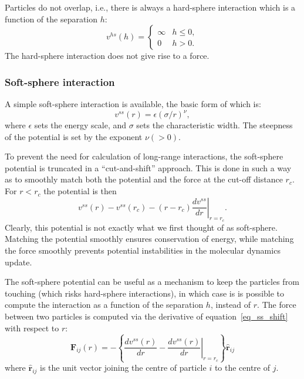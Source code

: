 Particles do not overlap, i.e., there is always
a hard-sphere interaction which is a function of the separation $h$:
\begin{equation}
v^{hs}(h) = \left\{
\begin{array}{ll}
\infty & h \leq 0,\\
0   & h > 0.
\end{array} \right.
\end{equation}
The hard-sphere interaction does not give rise to a force.


\subsubsection{Soft-sphere interaction}

A simple soft-sphere interaction is available, the basic form
of which is:
\begin{equation}
v^{ss}(r) = \epsilon (\sigma / r)^{\nu},
\end{equation}
where $\epsilon$ sets the energy scale, and $\sigma$ sets the
characteristic width. The steepness of the potential is set by
the exponent $\nu (> 0)$.

To prevent the need for calculation of long-range interactions,
the soft-sphere potential is truncated in a ``cut-and-shift''
approach. This is done in such a way as to smoothly match
both the potential and the force at the cut-off distance
$r_c$. For $r < r_c$ the potential is then
\begin{equation}
v^{ss}(r) - v^{ss}(r_c) - (r - r_c) \left.\frac{d v^{ss}}{dr}\right|_{r=r_c}.
\label{eq_ss_shift}
\end{equation}
Clearly, this potential is not exactly what we first thought of as
soft-sphere. Matching the potential smoothly ensures conservation
of energy, while matching the force smoothly prevents potential
instabilities in the molecular dynamics update.

The soft-sphere potential can be useful as a mechanism to
keep the particles from touching (which risks hard-sphere interactions),
in which case is is possible to compute the interaction as a function
of the separation $h$, instead of $r$. The force between
two particles is computed via the derivative of equation~\ref{eq_ss_shift}
with respect to $r$:
\begin{equation}
\mathbf{F}_{ij}(r) = -\left\{\frac{d v^{ss}(r)}{dr} -
\left. \frac{d v^{ss}(r)}{dr}\right|_{r=r_c} \right\} \mathbf{\hat{r}}_{ij}
\end{equation}
where $\mathbf{\hat{r}}_{ij}$ is the unit vector joining the centre of
particle $i$ to the centre of $j$.



